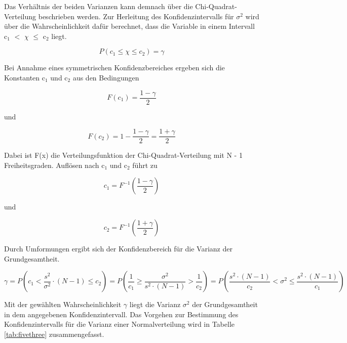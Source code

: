 \noindent Das Verh\"{a}ltnis der beiden Varianzen kann demnach \"{u}ber die Chi-Quadrat-Verteilung beschrieben werden. Zur Herleitung des Konfidenzintervalls f\"{u}r $\sigma^{2}$ wird \"{u}ber die Wahrscheinlichkeit daf\"{u}r berechnet, dass die Variable  in einem Intervall c$_{1}$ $\mathrm{<}$ $\chi$ $\leq$ c$_{2}$ liegt.

\begin{equation}\label{eq:fivefourty}
P\left(c_{1} \le \chi \le c_{2} \right)=\gamma
\end{equation}

Bei Annahme eines symmetrischen Konfidenzbereiches ergeben sich die Konstanten c$_{1}$ und c$_{2}$ aus den Bedingungen

\begin{equation}\label{eq:fivefourtyone}
F\left(c_{1} \right)=\dfrac{1-\gamma }{2}
\end{equation}

\noindent und 

\begin{equation}\label{eq:fivefourtytwo}
F\left(c_{2} \right)=1-\dfrac{1-\gamma }{2} =\dfrac{1+\gamma }{2}
\end{equation}

\noindent Dabei ist F(x) die Verteilungsfunktion der Chi-Quadrat-Verteilung mit N - 1 Freiheitsgraden. Aufl\"{o}sen nach c$_{1}$ und c$_{2}$ f\"{u}hrt zu

\begin{equation}\label{eq:fivefourtythree}
c_{1} =F^{-1} \left(\dfrac{1-\gamma }{2} \right)
\end{equation}

\noindent und

\begin{equation}\label{eq:fivefourtyfour}
c_{2} =F^{-1} \left(\dfrac{1+\gamma }{2} \right)
\end{equation}

\noindent Durch Umformungen ergibt sich der Konfidenzbereich f\"{u}r die Varianz der Grundgesamtheit.

\begin{equation}\label{eq:fivefourtyfive}
\gamma =P\left(c_{1} <\dfrac{s^{2} }{\sigma ^{2}} \cdot (N-1)\le c_{2} \right)=P\left(\dfrac{1}{c_{1}} \ge \dfrac{\sigma ^{2}}{s^{2} \cdot (N-1)} >\dfrac{1}{c_{2}} \right)=P\left(\dfrac{s^{2} \cdot (N-1)}{c_{2}} <\sigma ^{2} \le \dfrac{s^{2} \cdot (N-1)}{c_{1}} \right)
\end{equation}

\noindent Mit der gew\"{a}hlten Wahrscheinlichkeit $\gamma$ liegt die Varianz $\sigma^{2}$ der Grundgesamtheit in dem angegebenen Konfidenzintervall. Das Vorgehen zur Bestimmung des Konfidenzintervalls f\"{u}r die Varianz einer Normalverteilung wird in Tabelle \ref{tab:fivethree} zusammengefasst.


